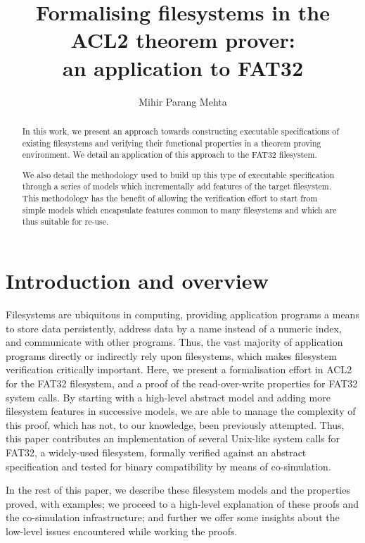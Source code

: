\documentclass[submission,copyright,creativecommons]{eptcs}
\title{Formalising filesystems in the ACL2 theorem prover:\\ an
  application to FAT32}
\author{Mihir Parang Mehta
\institute{Department of Computer Science\\
University of Texas at Austin\\
Austin, TX, USA}
\email{mihir@cs.utexas.edu}}
\begin{document}
\maketitle

\begin{abstract}
In this work, we present an
approach towards constructing executable specifications of existing
filesystems and verifying their functional properties in a theorem
proving environment. We detail an application of this approach to the
FAT32 filesystem.

We also detail the methodology used to build up this type of
executable specification through a series of models which
incrementally add features of the target filesystem. This methodology
has the benefit of allowing the verification effort to start from
simple models which encapsulate features common to many filesystems
and which are thus suitable for re-use.
\end{abstract}

\section{Introduction and overview}

Filesystems are ubiquitous in computing, providing application
programs a means to store data persistently, address data by a name
instead of a numeric index, and communicate with other programs.
Thus, the vast majority of application programs
directly or indirectly rely upon filesystems, which makes filesystem
verification critically important. Here, we present a
formalisation effort in ACL2 for the FAT32 filesystem, and a proof of
the read-over-write properties for FAT32 system calls. By starting
with a high-level abstract model and adding more filesystem features
in successive models, we are able to manage the complexity of this
proof, which has not, to our knowledge, been previously
attempted. Thus, this paper contributes an implementation of several
Unix-like system calls for FAT32, a widely-used filesystem, formally
verified against an abstract specification and tested for binary
compatibility by means of co-simulation.

In the rest of this paper, we describe these filesystem
models and the properties proved, with examples; we proceed to a
high-level explanation of these proofs and the co-simulation
infrastructure; and further we offer some insights about the low-level
issues encountered while working the proofs.
\end{document}
